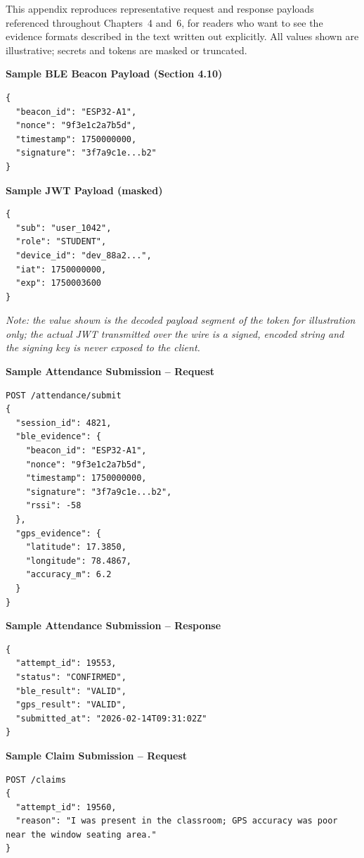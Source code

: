 \documentclass[12pt, a4paper, oneside]{report}
\begin{document}
This appendix reproduces representative request and response payloads referenced throughout Chapters~4 and~6, for readers who want to see the evidence formats described in the text written out explicitly. All values shown are illustrative; secrets and tokens are masked or truncated.

\noindent\textbf{Sample BLE Beacon Payload (Section 4.10)}

\begin{lstlisting}
{
  "beacon_id": "ESP32-A1",
  "nonce": "9f3e1c2a7b5d",
  "timestamp": 1750000000,
  "signature": "3f7a9c1e...b2"
}
\end{lstlisting}

\noindent\textbf{Sample JWT Payload (masked)}

\begin{lstlisting}
{
  "sub": "user_1042",
  "role": "STUDENT",
  "device_id": "dev_88a2...",
  "iat": 1750000000,
  "exp": 1750003600
}
\end{lstlisting}

\textit{Note: the value shown is the decoded payload segment of the token for illustration only; the actual JWT transmitted over the wire is a signed, encoded string and the signing key is never exposed to the client.}

\noindent\textbf{Sample Attendance Submission -- Request}

\begin{lstlisting}
POST /attendance/submit
{
  "session_id": 4821,
  "ble_evidence": {
    "beacon_id": "ESP32-A1",
    "nonce": "9f3e1c2a7b5d",
    "timestamp": 1750000000,
    "signature": "3f7a9c1e...b2",
    "rssi": -58
  },
  "gps_evidence": {
    "latitude": 17.3850,
    "longitude": 78.4867,
    "accuracy_m": 6.2
  }
}
\end{lstlisting}

\noindent\textbf{Sample Attendance Submission -- Response}

\begin{lstlisting}
{
  "attempt_id": 19553,
  "status": "CONFIRMED",
  "ble_result": "VALID",
  "gps_result": "VALID",
  "submitted_at": "2026-02-14T09:31:02Z"
}
\end{lstlisting}

\noindent\textbf{Sample Claim Submission -- Request}

\begin{lstlisting}
POST /claims
{
  "attempt_id": 19560,
  "reason": "I was present in the classroom; GPS accuracy was poor near the window seating area."
}
\end{lstlisting}
\end{document}
